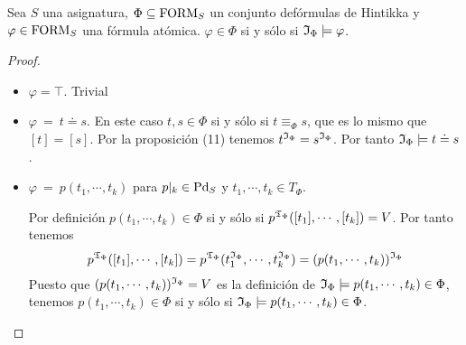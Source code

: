 \begin{lemma}
  Sea $S$ una asignatura, $\Phi\subseteq\mbox{FORM}_{S}$ un conjunto defórmulas de Hintikka y $\varphi\in\mbox{FORM}_{S}$ una fórmula atómica. $\varphi\in\Phi$ si y sólo si $\mathfrak{I}_{\Phi}\models\varphi$.
  \begin{proof} \mbox{ }
      \begin{itemize}
      \item $\varphi=\top$. Trivial
      \item $\varphi\ =\ t\doteq s$. En este caso $t,s\in\Phi$ si y sólo si $t\equiv_{\Phi}s$, que es lo mismo
        que  $[t]=[s]$. Por la proposición (11) tenemos $t^{\mathfrak{I}_{\Phi}}=s^{\mathfrak{I}_{\Phi}}$. Por tanto $\mathfrak{I}_{\Phi}\models t\doteq s$.
      \item $\varphi\ =\ p(t_{1},\cdots, t_{k})$ para $p|_{k}\in \mbox{Pd}_{S}$ y $t_{1},\cdots, t_{k}\in T_{\Phi}$.

        Por definición $p(t_{1},\cdots, t_{k})\in\Phi$ si y sólo si $p^{\mathfrak{T}_{\Phi}}([t_{1}],\cdots,[t_{k}]) = V$. Por tanto tenemos
        \[ p^{\mathfrak{T}_{\Phi}}([t_{1}],\cdots,[t_{k}])=
          p^{\mathfrak{T}_{\Phi}}(t_{1}^{\mathfrak{I}_{\Phi}},\cdots,t_{k}^{\mathfrak{I}_{\Phi}})=
          (p(t_{1},\cdots, t_{k}))^{\mathfrak{I}_{\Phi}} \]
        Puesto que $(p(t_{1},\cdots, t_{k}))^{\mathfrak{I}_{\Phi}}=V$ es la definición de $\mathfrak{I}_{\Phi}\models p(t_{1},\cdots, t_{k})\in\Phi$, tenemos $p(t_{1},\cdots, t_{k})\in\Phi$ si y sólo si $\mathfrak{I}_{\Phi}\models p(t_{1},\cdots, t_{k})\in\Phi$.
      \end{itemize}
  \end{proof}
\end{lemma}


